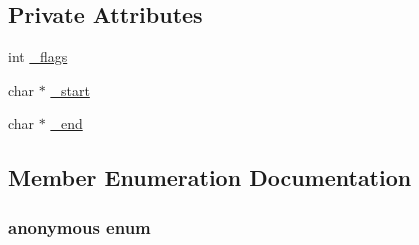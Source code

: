\subsection*{Private Attributes}
\begin{DoxyCompactItemize}
\item 
int \hyperlink{classtinyxml2_1_1_str_pair_ae6fabc08e7b24b0d41fa5f2fadbda4ed}{\-\_\-flags}
\item 
char $\ast$ \hyperlink{classtinyxml2_1_1_str_pair_acfd8687916a02833cc55c279460d2f4a}{\-\_\-start}
\item 
char $\ast$ \hyperlink{classtinyxml2_1_1_str_pair_a855c81f785458d8f84313221f2d4a1eb}{\-\_\-end}
\end{DoxyCompactItemize}


\subsection{Member Enumeration Documentation}
\hypertarget{classtinyxml2_1_1_str_pair_a0301ef962e15dd94574431f1c61266c5}{\subsubsection[{anonymous enum}]{\setlength{\rightskip}{0pt plus 5cm}anonymous enum}}\label{classtinyxml2_1_1_str_pair_a0301ef962e15dd94574431f1c61266c5}
